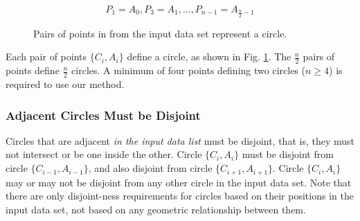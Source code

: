 \documentclass{article}
\begin{document}
\[ P_1 = A_0, P_3 = A_1, \ldots, P_{n-1} = A_{\frac{n}{2}-1} \]


\begin{figure}[!h]
\centering
{}
\caption{Pairs of points in from the input data set represent a circle.}
\label{fig:pairs_of_points_define_a_circle}
\end{figure}


Each pair of points \( \{C_i, A_i\} \) define a circle, as shown in Fig. \ref{fig:pairs_of_points_define_a_circle}. The \( \frac{n}{2} \) pairs of points define \( \frac{n}{2} \) circles. A minimum of four points defining two circles (\( n \geq 4 \)) is required to use our method.

\subsubsection{Adjacent Circles Must be Disjoint}
Circles that are adjacent \textit{in the input data list} must be disjoint, that is, they must not intersect or be one inside the other. Circle \( \{C_i, A_i\} \) must be disjoint from circle \( \{C_{i-1}, A_{i-1}\} \), and also disjoint from circle \( \{C_{i+1}, A_{i+1}\} \). Circle \( \{C_i, A_i\} \) may or may not be disjoint from any other circle in the input data set. Note that there are only disjoint-ness requirements for circles based on their positions in the input data set, not based on any geometric relationship between them.
\end{document}
